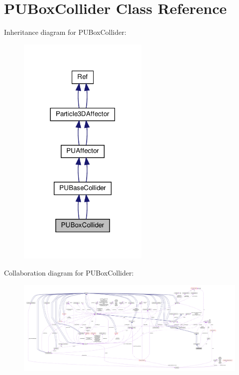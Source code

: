 \hypertarget{classPUBoxCollider}{}\section{P\+U\+Box\+Collider Class Reference}
\label{classPUBoxCollider}


Inheritance diagram for P\+U\+Box\+Collider\+:
\nopagebreak
\begin{figure}[H]
\begin{center}
\leavevmode
\includegraphics[width=177pt]{classPUBoxCollider__inherit__graph}
\end{center}
\end{figure}


Collaboration diagram for P\+U\+Box\+Collider\+:
\nopagebreak
\begin{figure}[H]
\begin{center}
\leavevmode
\includegraphics[width=350pt]{classPUBoxCollider__coll__graph}
\end{center}
\end{figure}
